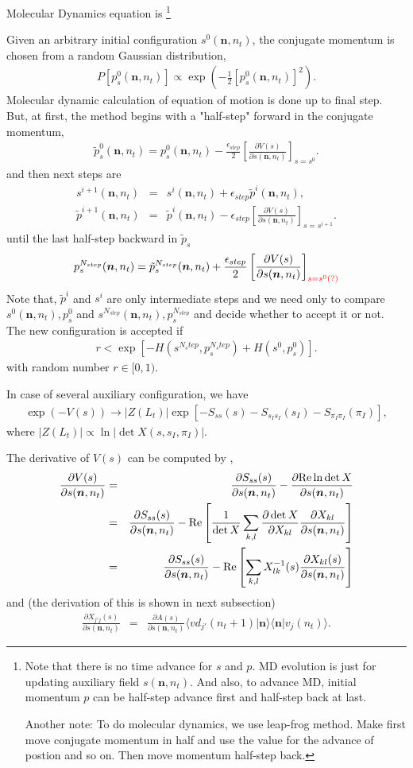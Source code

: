 \documentclass[10pt]{book}
\def\bm{\boldsymbol}
\newcommand{\bea}{\begin{eqnarray}}
\newcommand{\eea}{\end{eqnarray}}
\newcommand{\no}{\nonumber \\}
\newcommand{\del}{\partial}
\def\vn{{\bm n}}
\def\la{\langle}
\def\ra{\rangle}
\begin{document}
Molecular Dynamics equation is
\footnote{Note that there is no time advance for $s$ and $p$.
MD evolution is just for updating auxiliary field $s(\vn,n_t)$. 
And also, to advance MD, initial momentum $p$ can be
half-step advance first and half-step back at last. 

Another note: To do molecular dynamics, we use leap-frog method.
Make first move conjugate momentum in half and use the value for
the advance of postion and so on. Then move momentum  half-step back.   
}

Given an arbitrary initial configuration $s^0(\vn,n_t)$,
the conjugate momentum is chosen from a random Gaussian distribution,
\bea 
P[p_s^0(\vn,n_t)]\propto \exp(-\frac{1}{2}[p_s^0(\vn,n_t)]^2).
\eea 
Molecular dynamic calculation of equation of motion is done up to final step.
But, at first, the method begins with a "half-step" forward in the conjugate momentum,
\bea 
\tilde{p}^0_{s}(\vn,n_t)=p^0_s(\vn,n_t)-\frac{\epsilon_{step}}{2}\left[ \frac{\del V(s)}{\del s(\vn,n_t)}\right]_{s=s^0}. 
\eea 
and then next steps are 
\bea 
s^{i+1}(\vn,n_t)&=&s^i(\vn,n_t)+\epsilon_{step} \tilde{p}^i(\vn,n_t),\no 
\tilde{p}^{i+1}(\vn,n_t)&=&\tilde{p}^{i}(\vn,n_t)
               -\epsilon_{step}\left[\frac{\del V(s)}{\del s(\vn,n_t)} \right]_{s=s^{i+1}} .
\eea  
until the last half-step backward in $\tilde{p}_s$
\bea 
p_s^{N_{step}}(\vn,n_t)=\tilde{p}^{N_{step}}_{s}(\vn,n_t)+\frac{\epsilon_{step}}{2}\left[ \frac{\del V(s)}{\del s(\vn,n_t)}\right]_{\color{red}s=s^0(?)}
\eea 
Note that, $\tilde{p}^{i}$ and $s^{i}$ are only intermediate steps
and we need only to compare $s^{0}(\vn,n_t),p_s^0$ and $s^{N_{step}}(\vn,n_t), p^{N_{step}}_s$
and decide whether to accept it or not. The new configuration 
is accepted if 
\bea 
r < \exp[-H(s^{N_step},p_s^{N_step})+H(s^0,p^0_s) ].
\eea  
with random number $r\in [0,1)$.

In case of several auxiliary configuration,
we have
\bea 
\exp(-V(s))\to |Z(L_t)|\exp[-S_{ss}(s)-S_{s_I s_I}(s_I)-S_{\pi_I\pi_I}(\pi_I)],
\eea 
where $|Z(L_t)|\propto \ln |\det X(s,s_I,\pi_I)|$.


The derivative of $V(s)$ can be computed by ,
\bea 
\frac{\del V(s)}{\del s(\vn,n_t)}
&=& \frac{\del S_{ss}(s)}{\del s(\vn,n_t)}-\frac{\del {\rm Re}\ln\det X}{\del s(\vn,n_t)}\no 
&=& \frac{\del S_{ss}(s)}{\del s(\vn,n_t)}
  -{\rm Re}\left[\frac{1}{\det X}\sum_{k,l} \frac{\del \det X}{\del X_{kl}}\frac{\del X_{kl}}{\del s(\vn,n_t)}
  	  \right] \no 
&=& \frac{\del S_{ss}(s)}{\del s(\vn,n_t)}
  -  {\rm Re}\left[\sum_{k,l} X^{-1}_{lk}(s)\frac{\del X_{kl}(s)}{\del s(\vn,n_t)}
  \right]  
\eea 
and (the derivation of this is shown in next subsection)
\bea 
\frac{\del X_{j' j}(s)}{\del s(\vn,n_t)}
&=&\frac{\del A(s)}{\del s(\vn,n_t)} \la vd_{j'}(n_t+1)|\vn\ra \la \vn |v_{j}(n_t)\ra.
\eea 
\end{document}

